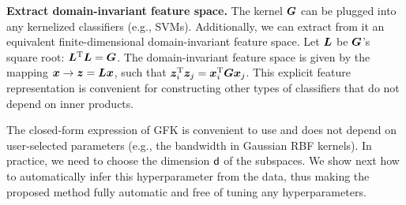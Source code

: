 {\bf Extract domain-invariant feature space.}  The kernel $\boldsymbol{G}$ can be plugged into any kernelized classifiers (e.g., SVMs). Additionally, we can extract from it an equivalent  finite-dimensional domain-invariant feature space. Let $\boldsymbol{L}$ be $\boldsymbol{G}$'s square root: $\boldsymbol{L}^{\textrm T}\boldsymbol{L} = \boldsymbol{G}$. The domain-invariant feature space is given by the mapping $\boldsymbol{x} \rightarrow  \boldsymbol{z} = \boldsymbol{L}\boldsymbol{x}$, such that $\boldsymbol{z}_i^{\textrm T}\boldsymbol{z}_j = \boldsymbol{x}_i^{\textrm T}\boldsymbol{G}\boldsymbol{x}_j$.  This explicit feature representation is convenient for constructing other types of classifiers that do not depend on inner products.


The closed-form expression of GFK is convenient to use and does not depend on user-selected parameters (e.g., the bandwidth in Gaussian RBF kernels). In practice, we need to choose the dimension $\mathsf{d}$ of the subspaces. We  show next how to automatically infer this hyperparameter from the data, thus making the proposed method fully automatic and free of tuning any hyperparameters.

